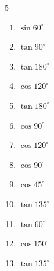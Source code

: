 \begin{multicols}{5}
\begin{enumerate}
  \item $\displaystyle \sin{60^\circ}$


  \item $\displaystyle \tan{90^\circ}$

        \phantom{$\displaystyle なし$}

  \item $\displaystyle \tan{180^\circ}$

        \phantom{$\displaystyle =0$}

  \item $\displaystyle \cos{120^\circ}$


  \item $\displaystyle \tan{180^\circ}$

        \phantom{$\displaystyle =0$}

\columnbreak %

  \item $\displaystyle \cos{90^\circ}$

        \phantom{$\displaystyle =0$}

  \item $\displaystyle \cos{120^\circ}$


  \item $\displaystyle \cos{90^\circ}$

        \phantom{$\displaystyle =0$}

  \item $\displaystyle \cos{45^\circ}$


  \item $\displaystyle \tan{135^\circ}$

        \phantom{$\displaystyle =-1$}

  \item $\displaystyle \tan{60^\circ}$


  \item $\displaystyle \cos{150^\circ}$


  \item $\displaystyle \tan{135^\circ}$


\end{enumerate}
\end{multicols}
